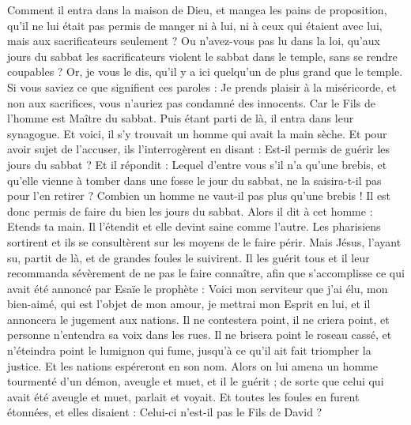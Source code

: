 \begin{multicols}{2}
Comment il entra dans la maison de Dieu, et mangea les pains de proposition, qu’il ne lui était pas permis de manger ni à lui, ni à ceux qui étaient avec lui, mais aux sacrificateurs seulement ?
Ou n'avez-vous pas lu dans la loi, qu'aux jours du sabbat les sacrificateurs violent le sabbat dans le temple, sans se rendre coupables ?
Or, je vous le dis, qu'il y a ici quelqu'un de plus grand que le temple.
Si vous saviez ce que signifient ces paroles : Je prends plaisir à la miséricorde, et non aux sacrifices, vous n'auriez pas condamné des innocents{}.
Car le Fils de l'homme est Maître du sabbat.
Puis étant parti de là, il entra dans leur synagogue.
Et voici, il s’y trouvait un homme qui avait la main sèche. Et pour avoir sujet de l'accuser, ils l'interrogèrent en disant : Est-il permis de guérir les jours du sabbat ?
Et il répondit : Lequel d’entre vous s'il n’a qu’une brebis, et qu'elle vienne à tomber dans une fosse le jour du sabbat, ne la saisira-t-il pas pour l’en retirer ?
Combien un homme ne vaut-il pas plus qu'une brebis ! Il est donc permis de faire du bien les jours du sabbat.
Alors il dit à cet homme : Etends ta main. Il l'étendit et elle devint saine comme l'autre.
Les pharisiens sortirent et ils se consultèrent sur les moyens de le faire périr.
Mais Jésus, l’ayant su, partit de là, et de grandes foules le suivirent. Il les guérit tous
et il leur recommanda sévèrement de ne pas le faire connaître,
afin que s’accomplisse ce qui avait été annoncé par Esaïe le prophète :
Voici mon serviteur que j'ai élu, mon bien-aimé, qui est l'objet de mon amour, je mettrai mon Esprit en lui, et il annoncera le jugement aux nations.
Il ne contestera point, il ne criera point, et personne n'entendra sa voix dans les rues.
Il ne brisera point le roseau cassé, et n'éteindra point le lumignon qui fume, jusqu'à ce qu'il ait fait triompher la justice.
Et les nations espéreront en son nom{}.
Alors on lui amena un homme tourmenté d'un démon, aveugle et muet, et il le guérit ; de sorte que celui qui avait été aveugle et muet, parlait et voyait.
Et toutes les foules en furent étonnées, et elles disaient : Celui-ci n'est-il pas le Fils de David ?
\end{multicols}
